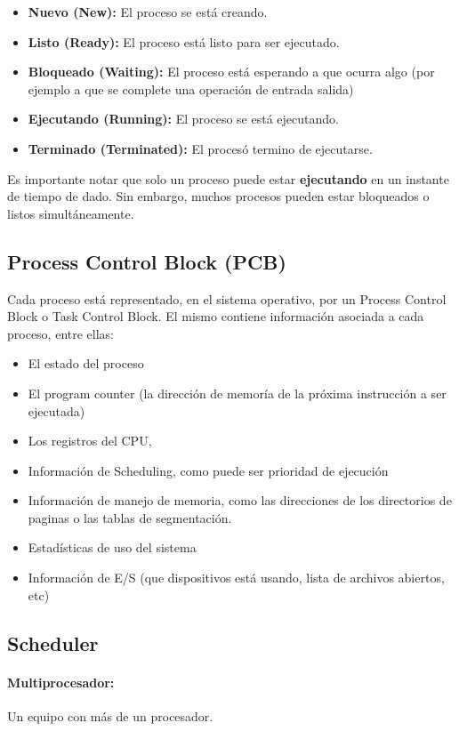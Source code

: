 \begin{itemize}
	\item \textbf{Nuevo (New):} El proceso se está creando.
	\item \textbf{Listo (Ready):} El proceso está listo para ser ejecutado.
	\item \textbf{Bloqueado (Waiting):} El proceso está esperando a que ocurra algo (por ejemplo a que se complete una operación de entrada salida)
	\item \textbf{Ejecutando (Running):} El proceso se está ejecutando.
	\item \textbf{Terminado (Terminated):} El procesó termino de ejecutarse.
\end{itemize}

Es importante notar que solo un proceso puede estar \textbf{ejecutando} en un instante de tiempo de dado. Sin embargo, muchos procesos pueden estar bloqueados o listos simultáneamente.

\subsection{Process Control Block (PCB)}
Cada proceso está representado, en el sistema operativo, por un Process Control Block o Task Control Block. El mismo contiene información asociada a cada proceso, entre ellas:
\begin{itemize}
	\item El estado del proceso
	\item El program counter (la dirección de memoría de la próxima instrucción a ser ejecutada)
	\item Los registros del CPU,
	\item Información de Scheduling, como puede ser prioridad de ejecución
	\item Información de manejo de memoria, como las direcciones de los directorios de paginas o las tablas de segmentación.
	\item Estadísticas de uso del sistema
	\item Información de E/S (que dispositivos está usando, lista de archivos abiertos, etc)
\end{itemize}

\subsection{Scheduler}
\paragraph{Multiprocesador:} Un equipo con más de un procesador.
